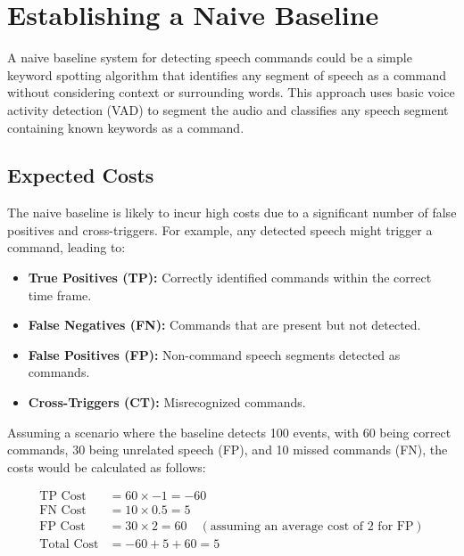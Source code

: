 \section{Establishing a Naive Baseline}
A naive baseline system for detecting speech commands could be a simple keyword spotting algorithm that identifies any segment of speech as a command without considering context or surrounding words. This approach uses basic voice activity detection (VAD) to segment the audio and classifies any speech segment containing known keywords as a command.

\subsection{Expected Costs}
The naive baseline is likely to incur high costs due to a significant number of false positives and cross-triggers. For example, any detected speech might trigger a command, leading to:

\begin{itemize}
  \item \textbf{True Positives (TP):} Correctly identified commands within the correct time frame.
  \item \textbf{False Negatives (FN):} Commands that are present but not detected.
  \item \textbf{False Positives (FP):} Non-command speech segments detected as commands.
  \item \textbf{Cross-Triggers (CT):} Misrecognized commands.
\end{itemize}

Assuming a scenario where the baseline detects 100 events, with 60 being correct commands, 30 being unrelated speech (FP), and 10 missed commands (FN), the costs would be calculated as follows:

\begin{align*}
\text{TP Cost} &= 60 \times -1 = -60 \\
\text{FN Cost} &= 10 \times 0.5 = 5 \\
\text{FP Cost} &= 30 \times 2 = 60 \quad (\text{assuming an average cost of 2 for FP}) \\
\text{Total Cost} &= -60 + 5 + 60 = 5
\end{align*}
